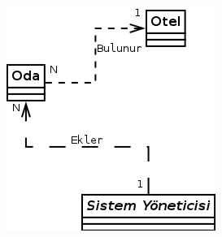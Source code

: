 \documentclass[12pt,a4paper]{report}
\begin{document}
\begin{center}
\includegraphics{dia/usecase3.png}
\end{center}
\end{document}
